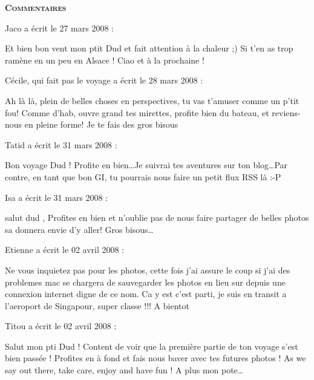 \bigskip
\textbf{\textsc{Commentaires}}

\medskip
Jaco a écrit le 27 mars 2008 :
\begin{displayquote}
Et bien bon vent mon ptit Dud et fait attention à la chaleur ;) Si t'en as trop ramène en un peu en Alsace !
Ciao et à la prochaine !
\end{displayquote}

\medskip
Cécile, qui fait pas le voyage a écrit le 28 mars 2008 :
\begin{displayquote}
Ah là là, plein de belles choses en perspectives, tu vas t'amuser comme un p'tit fou! Comme d'hab, ouvre grand tes mirettes, profite bien du bateau, et reviens-nous en pleine forme!
Je te fais des gros bisous
\end{displayquote}

\medskip
Tatid a écrit le 31 mars 2008 :
\begin{displayquote}
Bon voyage Dud ! Profite en bien\dots Je suivrai tes aventures sur ton blog\dots Par contre, en tant que bon GI, tu pourrais nous faire un petit flux RSS là :-P
\end{displayquote}

\medskip
Isa a écrit le 31 mars 2008 :
\begin{displayquote}
salut dud ,
Profites en bien et n'oublie pas de nous faire partager de belles photos sa donnera envie d'y aller!
Gros bisous\dots
\end{displayquote}

\medskip
Etienne a écrit le 02 avril 2008 :
\begin{displayquote}
Ne vous inquietez pas pour les photos, cette fois j'ai assure le coup si j'ai des problemes mac se chargera de sauvegarder les photos en lieu sur depuis une connexion internet digne de ce nom.
Ca y est c'est parti, je suis en transit a l'aeroport de Singapour, super classe !!!
A bientot
\end{displayquote}

\medskip
Titou a écrit le 02 avril 2008 :
\begin{displayquote}
Salut mon pti Dud ! Content de voir que la première partie de ton voyage s'est bien passée ! Profites en à fond et fais nous baver avec tes futures photos !
As we say out there, take care, enjoy and have fun !
A plus mon pote\dots
\end{displayquote}

\vfill
